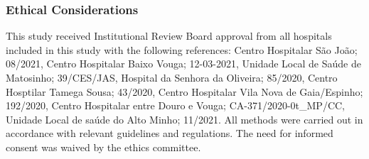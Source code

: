 \subsubsection{Ethical Considerations}
This study received Institutional Review Board approval from all hospitals included in this study with the following references: Centro Hospitalar São João; 08/2021, Centro Hospitalar Baixo Vouga; 12-03-2021, Unidade Local de Sa\'{u}de de Matosinho; 39/CES/JAS, Hospital da Senhora da Oliveira; 85/2020, Centro Hosptilar Tamega Sousa; 43/2020, Centro Hospitalar Vila Nova de Gaia/Espinho; 192/2020, Centro Hospitalar entre Douro e Vouga; CA-371/2020-0t\_MP/CC, Unidade Local de sa\'{u}de do Alto Minho; 11/2021. All methods were carried out in accordance with relevant guidelines and regulations. The need for informed consent was waived by the ethics committee. 
    